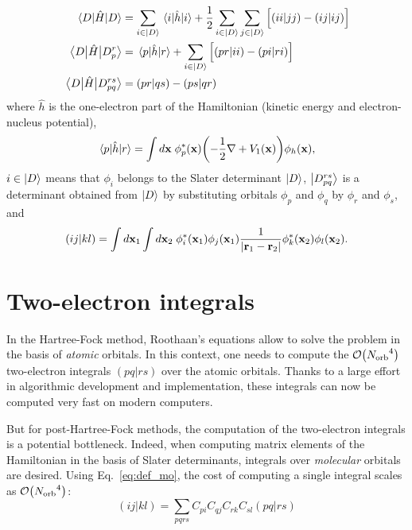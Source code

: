 \documentclass[./thesis.tex]{subfiles}
\begin{document}
\begin{align}
\mel{D}{\hat{H}}{D} & = \sum_{i\in \ket{D}} \mel{i}{\hat{h}}{i} + \frac{1}{2} \sum_{i\in \ket{D}} \sum_{j\in \ket{D}} \Big [ (ii|jj) - (ij|ij) \Big ]      \\
\mel{D}{\hat{H}}{D_p^r} & = \mel{p}{\hat{h}}{r} + \sum_{i\in \ket{D}} \Big [ (pr|ii) - (pi|ri) \Big ]        \\
\mel{D}{\hat{H}}{D_{pq}^{rs}} & = (pr|qs) - (ps|qr)
\end{align}
where $\hat{h}$ is the one-electron part of the Hamiltonian (kinetic energy and
electron-nucleus potential),
\begin{equation}
\mel{p}{\hat{h}}{r} = \int d{\bf x}\; \phi^*_p(\mathbf{x}) \qty( -\frac{1}{2}\nabla + V_1(\mathbf{x})) \phi_h(\mathbf{x}),
\end{equation}
$i \in \ket{D}$ means that $\phi_i$ belongs to the
Slater determinant $\ket{D}$, $\ket {D_{pq}^{rs}}$ is a determinant obtained from $\ket
D$ by substituting orbitals $\phi_p$ and $\phi_q$ by $\phi_r$ and
$\phi_s$, and
\begin{equation}
(ij|kl) = \int d{\bf x}_1 \int d{\bf x}_2 \; \phi^*_i({\bf x}_1)\phi_j({\bf x}_1) \frac{1}{|{\bf r}_1 - {\bf r}_2|} \phi^*_k({\bf x}_2)\phi_l({\bf x}_2).
\end{equation}

\section{Two-electron integrals}

In the Hartree-Fock method, Roothaan's equations allow to solve the problem in the basis of 
\emph{atomic} orbitals.\cite{Roothaan_1951}
In this context, one needs to compute the $\order{\Norb^4}$ two-electron integrals $(pq|rs)$ over the
atomic orbitals. Thanks to a large effort in algorithmic development and
implementation,\cite{Obara_1986,Head_Gordon_1988,Ten_no_1993,Gill_1989,Gill_1991,Libint2,Zhang_2018}
these integrals can now be computed very fast on modern computers.

But for post-Hartree-Fock methods, the computation of the two-electron
integrals is a potential bottleneck.
Indeed, when computing matrix elements of the Hamiltonian in the basis of
Slater determinants, integrals over \emph{molecular} orbitals are desired. Using
Eq.~\eqref{eq:def_mo},
the cost of computing a single integral scales as $\order{\Norb^4}$:
\begin{equation}
(ij|kl) = \sum_{pqrs} C_{pi} C_{qj} C_{rk} C_{sl} (pq|rs)
\end{equation}
\end{document}
